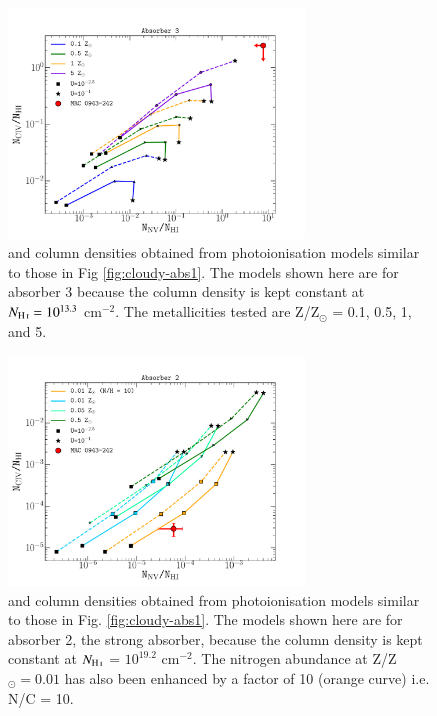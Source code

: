 \begin{figure}
\centering
\includegraphics[width=0.7\textwidth]{plots_chp3/0943_agn_photoion_CIV_NV_HI_abs3_hden_2.pdf}
\caption[Absorber 2:  photoionisation predictions]{ and  column densities obtained from  photoionisation models similar to those in Fig \ref{fig:cloudy-abs1}. The models shown here are for absorber 3 because the  column density is kept constant at $N_{\ion{H}{I}} = 10^{13.3}$ cm$^{-2}.$ The metallicities tested are Z/Z$_\odot$ = 0.1, 0.5, 1, and 5.}
\label{fig:cloudy-abs3}
\end{figure} 

\begin{figure}
\centering
\includegraphics[width=0.7\textwidth]{plots_chp3/0943_agn_photoion_CIV_NV_HI_abs2_hden_2.pdf}
\caption[Absorber 3:  photoionisation predictions]{ and  column densities obtained from photoionisation  models similar to those in Fig. \ref{fig:cloudy-abs1}. The models shown here are for absorber 2, the strong absorber, because the  column density is kept constant at $N_{\ion{H}{I}}$ = $10^{19.2}$ cm$^{-2}.$ The nitrogen abundance at Z/Z$_\odot = 0.01$ has also been enhanced by a factor of 10 (orange curve) i.e. N/C = 10.}
\label{fig:cloudy-abs2}
\end{figure}

